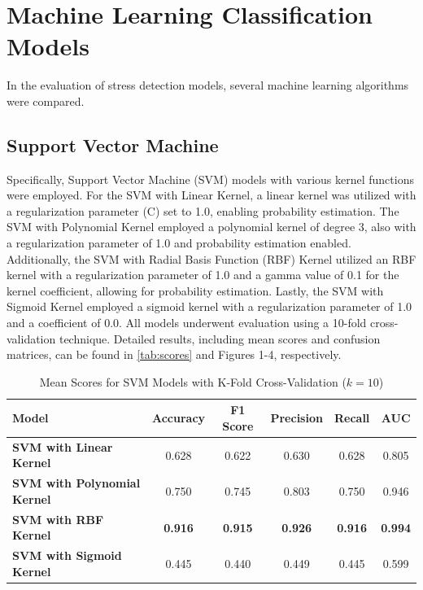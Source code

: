 \section{Machine Learning Classification Models} 
In the evaluation of stress detection models, several machine learning algorithms were compared.
\subsection*{Support Vector Machine}
Specifically, Support Vector Machine (SVM) models with various kernel functions were employed. For the SVM with Linear Kernel, a linear kernel was utilized with a regularization parameter (C) set to 1.0, enabling probability estimation. The SVM with Polynomial Kernel employed a polynomial kernel of degree 3, also with a regularization parameter of 1.0 and probability estimation enabled. Additionally, the SVM with Radial Basis Function (RBF) Kernel utilized an RBF kernel with a regularization parameter of 1.0 and a gamma value of 0.1 for the kernel coefficient, allowing for probability estimation. Lastly, the SVM with Sigmoid Kernel employed a sigmoid kernel with a regularization parameter of 1.0 and a coefficient of 0.0. All models underwent evaluation using a 10-fold cross-validation technique. Detailed results, including mean scores and confusion matrices, can be found in \autoref{tab:scores} and Figures 1-4, respectively.

\begin{table}[hhtbp]
    \centering
    \begin{tabular}{|l|c|c|c|c|c|}
    \hline
    \textbf{Model} & \textbf{Accuracy} & \textbf{F1 Score} & \textbf{Precision} & \textbf{Recall} & \textbf{AUC} \\ \hline
    \textbf{SVM with Linear Kernel} & 0.628 & 0.622 & 0.630 & 0.628 & 0.805 \\
    \textbf{SVM with Polynomial Kernel } & 0.750 & 0.745 & 0.803 & 0.750 & 0.946 \\
    \textbf{SVM with RBF Kernel} & \textbf{0.916} & \textbf{0.915} & \textbf{0.926} & \textbf{0.916} & \textbf{0.994} \\
    \textbf{SVM with Sigmoid Kernel} & 0.445 & 0.440 & 0.449 & 0.445 & 0.599 \\ \hline
    \end{tabular}
    \caption{Mean Scores for SVM Models with K-Fold Cross-Validation ($k=10$)}
    \label{tab:scores}
    \end{table}
    

